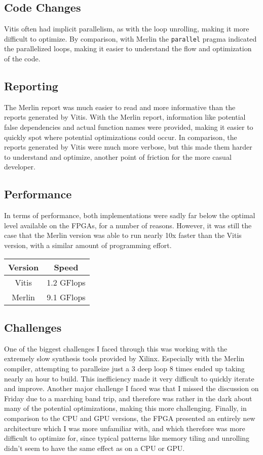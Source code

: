 \documentclass[letterpaper,twocolumn,10pt]{article}
\def\code#1{\texttt{#1}}
\begin{document}
\subsection{Code Changes}
Vitis often had implicit parallelism, as with the loop unrolling, making it
more difficult to optimize. By comparison, with Merlin the \code{parallel}
pragma indicated the parallelized loops, making it easier to understand the
flow and optimization of the code.
\subsection{Reporting}
The Merlin report was much easier to read and more informative than the reports
generated by Vitis. With the Merlin report, information like potential false
dependencies and actual function names were provided, making it easier to
quickly spot where potential optimizations could occur. In comparison, the
reports generated by Vitis were much more verbose, but this made them harder to
understand and optimize, another point of friction for the more casual
developer.
\subsection{Performance}
In terms of performance, both implementations were sadly far below the optimal
level available on the FPGAs, for a number of reasons. However, it was still
the case that the Merlin version was able to run nearly 10x faster than the
Vitis version, with a similar amount of programming effort.
\begin{center}
    \begin{tabular}{|c|c|}
        \hline
        Version & Speed \\ \hline
        Vitis & 1.2 GFlops \\ \hline
        Merlin & 9.1 GFlops \\ \hline
    \end{tabular}
\end{center}
\subsection{Challenges}
One of the biggest challenges I faced through this was working with the
extremely slow synthesis tools provided by Xilinx. Especially with the Merlin
compiler, attempting to paralleize just a 3 deep loop 8 times ended up taking
nearly an hour to build. This inefficiency made it very difficult to quickly
iterate and improve. Another major challenge I faced was that I missed the
discussion on Friday due to a marching band trip, and therefore was rather in
the dark about many of the potential optimizations, making this more
challenging. Finally, in comparison to the CPU and GPU versions, the FPGA
presented an entirely new architecture which I was more unfamiliar with, and 
which therefore was more difficult to optimize for, since typical patterns like
memory tiling and unrolling didn't seem to have the same effect as on a CPU or
GPU. 
\end{document}
